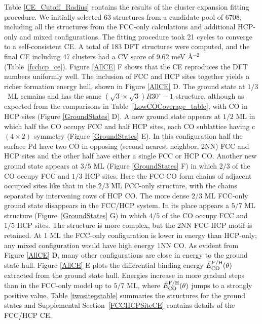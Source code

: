 \documentclass[11pt]{article}
\begin{document}
Table \ref{CE_Cutoff_Radius} contains the results of the cluster expansion fitting procedure. We initially selected 63 structures from a candidate pool of 6708, including all the structures from the FCC-only calculations and additional HCP-only and mixed configurations. The fitting procedure took 21 cycles to converge to a self-consistent CE.  A total of 183 DFT structures were computed, and the final CE including 47 clusters had a CV score of 9.62 meV \AA$^{-2}$ (Table~\ref{fcchcp_ce}). Figure \ref{AllCE} F shows that the CE reproduces the DFT numbers uniformly well.  The inclusion of FCC and HCP sites together yields a richer formation energy hull, shown in Figure \ref{AllCE} D. The ground state at $1/3$~ML remains and has the same $(\sqrt{3} \times \sqrt{3})R30^\circ-1$  structure, although as expected from the comparisons in Table~\ref{LowCOCoverage_table}, with CO in HCP sites (Figure \ref{GroundStates} D).  A new ground state appears at $1/2$ ML in which half the CO occupy FCC and half HCP sites, each CO sublattice having c$(4\times2)$ symmetry (Figure \ref{GroundStates} E).  In this configuration half the surface Pd have two CO in opposing (second nearest neighbor, 2NN) FCC and HCP sites and the other half have either a single FCC or HCP CO.  Another new ground state appears at $3/5$ ML (Figure \ref{GroundStates} F) in which $2/3$ of the CO occupy FCC and $1/3$ HCP sites.  Here the FCC CO form chains of adjacent occupied sites like that in the $2/3$ ML FCC-only structure, with the chains separated by intervening rows of HCP CO.  The more dense $2/3$ ML FCC-only ground state disappears in the FCC/HCP system.  In its place appears a $5/7$ ML structure (Figure~\ref{GroundStates} G) in which $4/5$ of the CO occupy FCC and $1/5$ HCP sites.  The structure is more complex, but the 2NN FCC-HCP motif is retained.  At $1$ ML the FCC-only configuration is lower in energy than HCP-only; any mixed configuration would have high energy 1NN CO. As evident from Figure \ref{AllCE} D, many other configurations are close in energy to the ground state hull.  Figure \ref{AllCE} E plots the differential binding energy $\bar{E}_{\ce{CO}}^{\mathrm{F/H}}(\theta)$ extracted from the ground state hull.  Energies increase in more gradual steps than in the FCC-only model up to $5/7$ ML, where $\bar{E}_{\ce{CO}}^{\text{F/H}}(\theta)$ jumps to a strongly positive value.  Table \ref{twositegstable} summaries the structures for the ground states and Supplemental Section~\ref{FCCHCPSiteCE} contains details of the FCC/HCP CE. 
\end{document}
